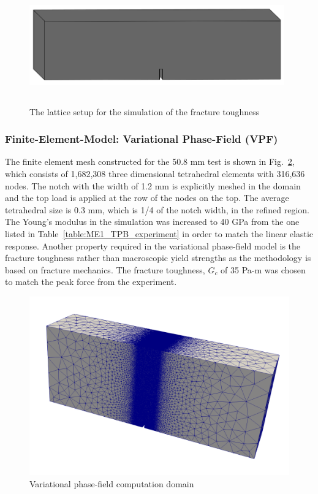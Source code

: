 \begin{figure}[!ht]
\centering
\includegraphics[width=11cm,height=5cm]{figures/Amir_ME1_LEM_Setup.png}
\caption{The lattice setup for the simulation of the fracture toughness}
\label{fig:Amir_ME1_LEM_Setup}
\end{figure}


\subsubsection*{Finite-Element-Model: Variational Phase-Field (VPF)}

The finite element mesh constructed for the 50.8 mm test is shown in Fig.~\ref{fig:ME1_TPB_VF_domain}, which consists of 1,682,308 three dimensional tetrahedral elements with 316,636 nodes.
The notch with the width of 1.2 mm is explicitly meshed in the domain and the top load is applied at the row of the nodes on the top.
The average tetrahedral size is 0.3 mm, which is 1/4 of the notch width, in the refined region.
The Young's modulus in the simulation was increased to 40 GPa from the one listed in Table~\ref{table:ME1_TPB_experiment} in order to match the linear elastic response. 
Another property required in the variational phase-field model is the fracture toughness rather than macroscopic yield strengths as the methodology is based on fracture mechanics.
The fracture toughness, $G_c$ of 35 Pa-m was chosen to match the peak force from the experiment.

\begin{figure}[!ht]
\centering
\includegraphics[width=1\textwidth]{figures/VPF_model_domain_mesh.png}
\caption{Variational phase-field computation domain}
\label{fig:ME1_TPB_VF_domain}
\end{figure}

